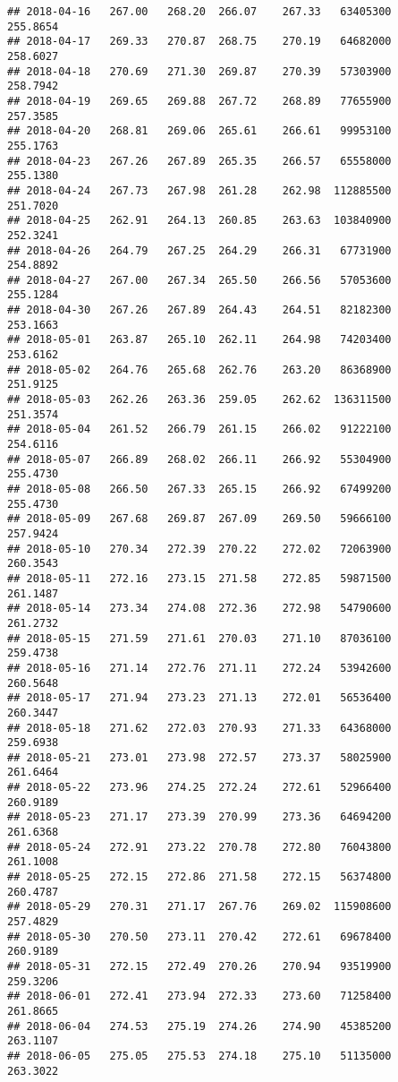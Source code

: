 \documentclass[
]{article}
\begin{document}
\begin{verbatim}
## 2018-04-16   267.00   268.20  266.07    267.33   63405300     255.8654
## 2018-04-17   269.33   270.87  268.75    270.19   64682000     258.6027
## 2018-04-18   270.69   271.30  269.87    270.39   57303900     258.7942
## 2018-04-19   269.65   269.88  267.72    268.89   77655900     257.3585
## 2018-04-20   268.81   269.06  265.61    266.61   99953100     255.1763
## 2018-04-23   267.26   267.89  265.35    266.57   65558000     255.1380
## 2018-04-24   267.73   267.98  261.28    262.98  112885500     251.7020
## 2018-04-25   262.91   264.13  260.85    263.63  103840900     252.3241
## 2018-04-26   264.79   267.25  264.29    266.31   67731900     254.8892
## 2018-04-27   267.00   267.34  265.50    266.56   57053600     255.1284
## 2018-04-30   267.26   267.89  264.43    264.51   82182300     253.1663
## 2018-05-01   263.87   265.10  262.11    264.98   74203400     253.6162
## 2018-05-02   264.76   265.68  262.76    263.20   86368900     251.9125
## 2018-05-03   262.26   263.36  259.05    262.62  136311500     251.3574
## 2018-05-04   261.52   266.79  261.15    266.02   91222100     254.6116
## 2018-05-07   266.89   268.02  266.11    266.92   55304900     255.4730
## 2018-05-08   266.50   267.33  265.15    266.92   67499200     255.4730
## 2018-05-09   267.68   269.87  267.09    269.50   59666100     257.9424
## 2018-05-10   270.34   272.39  270.22    272.02   72063900     260.3543
## 2018-05-11   272.16   273.15  271.58    272.85   59871500     261.1487
## 2018-05-14   273.34   274.08  272.36    272.98   54790600     261.2732
## 2018-05-15   271.59   271.61  270.03    271.10   87036100     259.4738
## 2018-05-16   271.14   272.76  271.11    272.24   53942600     260.5648
## 2018-05-17   271.94   273.23  271.13    272.01   56536400     260.3447
## 2018-05-18   271.62   272.03  270.93    271.33   64368000     259.6938
## 2018-05-21   273.01   273.98  272.57    273.37   58025900     261.6464
## 2018-05-22   273.96   274.25  272.24    272.61   52966400     260.9189
## 2018-05-23   271.17   273.39  270.99    273.36   64694200     261.6368
## 2018-05-24   272.91   273.22  270.78    272.80   76043800     261.1008
## 2018-05-25   272.15   272.86  271.58    272.15   56374800     260.4787
## 2018-05-29   270.31   271.17  267.76    269.02  115908600     257.4829
## 2018-05-30   270.50   273.11  270.42    272.61   69678400     260.9189
## 2018-05-31   272.15   272.49  270.26    270.94   93519900     259.3206
## 2018-06-01   272.41   273.94  272.33    273.60   71258400     261.8665
## 2018-06-04   274.53   275.19  274.26    274.90   45385200     263.1107
## 2018-06-05   275.05   275.53  274.18    275.10   51135000     263.3022

\end{verbatim}
\end{document}

